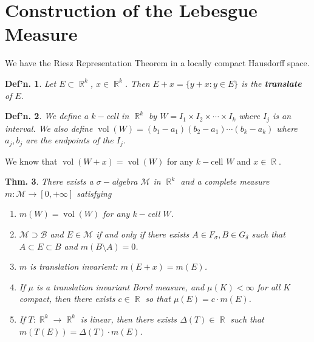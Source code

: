 \documentclass[12pt, a4paper]{book}
\DeclareMathOperator{\R}{\mathbb{R}}
\DeclareMathOperator{\vol}{vol}
\newtheorem{theorem}{Thm.}[section]
\newtheorem{definition}[theorem]{Def'n.}
\theoremstyle{nonumberplain}
\begin{document}
\section{Construction of the Lebesgue Measure}
We have the Riesz Representation Theorem in a locally compact Hausdorff space.
\begin{definition}
    Let $E\subset\R^k$, $x\in\R^k$.
    Then $E+x=\{y+x:y\in E\}$ is the \textbf{translate} of $E$.
\end{definition}
\begin{definition}
    We define a $k-$cell in $\R^k$ by $W=I_1\times I_2\times\cdots\times I_k$ where $I_j$ is an interval.
    We also define $\vol(W)=(b_1-a_1)(b_2-a_1)\cdots(b_k-a_k)$ where $a_j,b_j$ are the endpoints of the $I_j$.
\end{definition}
We know that $\vol(W+x)=\vol(W)$ for any $k-$cell $W$ and $x\in\R$.
\begin{theorem}
    There exists a $\sigma-$algebra $\mathcal{M}$ in $\R^k$ and a complete measure $m:\mathcal{M}\to[0,+\infty]$ satisfying
    \begin{enumerate}[nolistsep]
        \item $m(W)=\vol(W)$ for any $k-$cell $W$.
        \item $\mathcal{M}\supset\mathcal{B}$ and $E\in\mathcal{M}$ if and only if there exists $A\in F_\sigma,B\in G_\delta$ such that $A\subset E\subset B$ and $m(B\setminus A)=0$.
        \item $m$ is translation invarient: $m(E+x)=m(E)$.
        \item If $\mu$ is a translation invariant Borel measure, and $\mu(K)<\infty$ for all $K$ compact, then there exists $c\in\R$ so that $\mu(E)=c\cdot m(E)$.
        \item If $T:\R^k\to\R^k$ is linear, then there exists $\Delta(T)\in\R$ such that $m(T(E))=\Delta(T)\cdot m(E)$.
    \end{enumerate}
\end{theorem}
\end{document}

